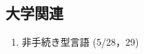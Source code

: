 \documentclass[fleqn, 14pt]{extarticle}
\begin{document}
\subsection{大学関連}
\label{sec4-3}
\begin{enumerate}
\item 非手続き型言語
  \hfill
  \label{sec4-3-enum1}
  (5/28，29)
\end{enumerate}




\end{document}
